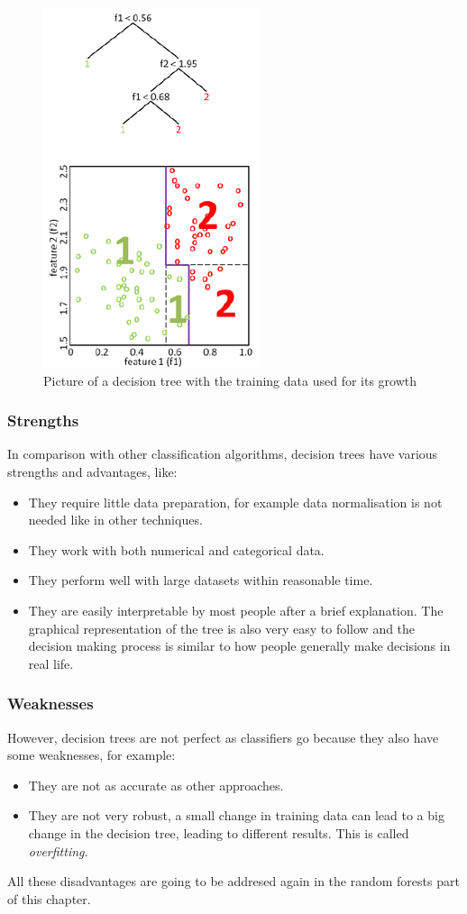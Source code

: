 \documentclass[11pt]{article}
\begin{document}
        \begin{figure}
          \centering
          \includegraphics[scale=0.7]{thesis_res/decision_tree.png}
          \caption{Picture of a decision tree with the training data used for its growth \cite{digstaining}}
          \label{figure:decision_tree}
        \end{figure}
      \subsubsection{Strengths}
        In comparison with other classification algorithms, decision trees have various strengths and advantages, like:
        \begin{itemize}
        \item They require little data preparation, for example data normalisation is not needed like in other techniques. \cite{isl}
        \item They work with both numerical and categorical data. \cite{isl}
        \item They perform well with large datasets within reasonable time. \cite{breiman}
        \item They are easily interpretable by most people after a brief explanation. The graphical representation of the tree is also very easy to follow and the decision making process is similar to how people generally make decisions in real life. \cite{isl}
        \end{itemize}
      \subsubsection{Weaknesses}
        However, decision trees are not perfect as classifiers go because they also have some weaknesses, for example:
        \begin{itemize}
        \item They are not as accurate as other approaches. \cite{isl}
        \item They are not very robust, a small change in training data can lead to a big change in the decision tree, leading to different results. This is called {\it overfitting}. \cite{isl}
        \end{itemize}
        All these disadvantages are going to be addresed again in the random forests part of this chapter.
\end{document}
